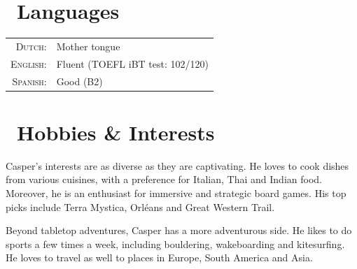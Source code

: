 \documentclass[a4paper,8pt]{article}
\begin{document}
\section{\faCommenting\ Languages}
\begin{tabular}{rl}
 \textsc{Dutch:}&Mother tongue\\
\textsc{English:}&Fluent (TOEFL iBT test: 102/120)\\
\textsc{Spanish:}&Good (B2)\\
\end{tabular}


\section{\faDice\ Hobbies \& Interests}
Casper's interests are as diverse as they are captivating. He loves to cook dishes from various cuisines, with a preference for Italian, Thai and Indian food. Moreover, he is an enthusiast for immersive and strategic board games. His top picks include Terra Mystica, Orl\'{e}ans and Great Western Trail.

Beyond tabletop adventures, Casper has a more adventurous side. He likes to do sports a few times a week, including bouldering, wakeboarding and kitesurfing. He loves to travel as well to places in Europe, South America and Asia.
\end{document}
